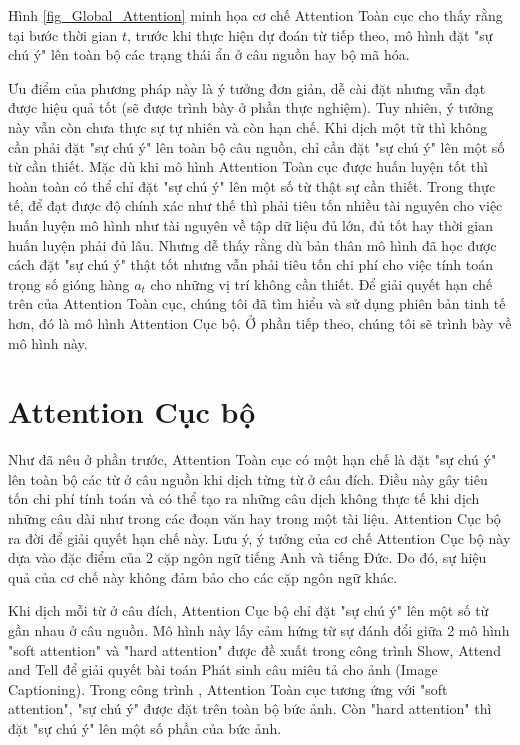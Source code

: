Hình \ref{fig_Global_Attention} minh họa cơ chế Attention Toàn cục cho thấy rằng tại bước thời gian $t$, trước khi thực hiện dự đoán từ tiếp theo, mô hình đặt "sự chú ý" lên toàn bộ các trạng thái ẩn ở câu nguồn hay bộ mã hóa.

Ưu điểm của phương pháp này là ý tưởng đơn giản, dễ cài đặt nhưng vẫn đạt được hiệu quả tốt (sẽ được trình bày ở phần thực nghiệm). Tuy nhiên, ý tưởng này vẫn còn chưa thực sự tự nhiên và còn hạn chế. Khi dịch một từ thì không cần phải đặt "sự chú ý" lên toàn bộ câu nguồn, chỉ cần đặt "sự chú ý" lên một số từ cần thiết. Mặc dù khi mô hình Attention Toàn cục được huấn luyện tốt thì hoàn toàn có thể chỉ đặt "sự chú ý" lên một số từ thật sự cần thiết. Trong thực tế, để đạt được độ chính xác như thế thì phải tiêu tốn nhiều tài nguyên cho việc huấn luyện mô hình như tài nguyên về tập dữ liệu đủ lớn, đủ tốt hay thời gian huấn luyện phải đủ lâu. Nhưng dễ thấy rằng dù bản thân mô hình đã học được cách đặt "sự chú ý" thật tốt nhưng vẫn phải tiêu tốn chi phí cho việc tính toán trọng số gióng hàng $a_t$ cho những vị trí không cần thiết.
Để giải quyết hạn chế trên của Attention Toàn cục, chúng tôi đã tìm hiểu và sử dụng phiên bản tinh tế hơn, đó là mô hình Attention Cục bộ. Ở phần tiếp theo, chúng tôi sẽ trình bày về mô hình này.

\section{Attention Cục bộ}
Như đã nêu ở phần trước, Attention Toàn cục có một hạn chế là đặt "sự chú ý" lên toàn bộ các từ ở câu nguồn khi dịch từng từ ở câu đích. Điều này gây tiêu tốn chi phí tính toán và có thể tạo ra những câu dịch không thực tế khi dịch những câu dài như trong các đoạn văn hay trong một tài liệu. Attention Cục bộ ra đời để giải quyết hạn chế này. Lưu ý, ý tưởng của cơ chế Attention Cục bộ này dựa vào đặc điểm của 2 cặp ngôn ngữ tiếng Anh và tiếng Đức. Do đó, sự hiệu quả của cơ chế này không đảm bảo cho các cặp ngôn ngữ khác.

Khi dịch mỗi từ ở câu đích, Attention Cục bộ chỉ đặt "sự chú ý" lên một số từ gần nhau ở câu nguồn. Mô hình này lấy cảm hứng từ sự đánh đổi giữa 2 mô hình "soft attention" và "hard attention" được đề xuất trong công trình Show, Attend and Tell \cite{showattendandtellXu2015} để giải quyết bài toán Phát sinh câu miêu tả cho ảnh (Image Captioning). Trong công trình \cite{showattendandtellXu2015}, Attention Toàn cục tương ứng với "soft attention", "sự chú ý" được đặt trên toàn bộ bức ảnh. Còn "hard attention" thì đặt "sự chú ý" lên một số phần của bức ảnh.

